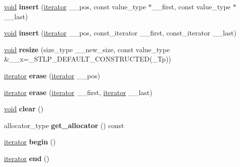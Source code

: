 \begin{DoxyCompactItemize}
\mbox{\label{classdeque_a28b09601f9bfe385b4a813756b20bf4d}} 
\hyperlink{interfacevoid}{void} {\bfseries insert} (\hyperlink{structiterator}{iterator} \+\_\+\+\_\+pos, const value\+\_\+type $\ast$\+\_\+\+\_\+first, const value\+\_\+type $\ast$\+\_\+\+\_\+last)
\item 
\mbox{\label{classdeque_a9d1bb677797bb0a66c9a3fd5ca02576f}} 
\hyperlink{interfacevoid}{void} {\bfseries insert} (\hyperlink{structiterator}{iterator} \+\_\+\+\_\+pos, const\+\_\+iterator \+\_\+\+\_\+first, const\+\_\+iterator \+\_\+\+\_\+last)
\item 
\mbox{\label{classdeque_ae7e21dc40af799077eac515304b8735d}} 
\hyperlink{interfacevoid}{void} {\bfseries resize} (size\+\_\+type \+\_\+\+\_\+new\+\_\+size, const value\+\_\+type \&\+\_\+\+\_\+x=\+\_\+\+S\+T\+L\+P\+\_\+\+D\+E\+F\+A\+U\+L\+T\+\_\+\+C\+O\+N\+S\+T\+R\+U\+C\+T\+ED(\+\_\+\+Tp))
\item 
\mbox{\label{classdeque_a0c84b0b6e601140132de6324489f0b4d}} 
\hyperlink{structiterator}{iterator} {\bfseries erase} (\hyperlink{structiterator}{iterator} \+\_\+\+\_\+pos)
\item 
\mbox{\label{classdeque_a745e68373354ed0bab1ed5edec114c01}} 
\hyperlink{structiterator}{iterator} {\bfseries erase} (\hyperlink{structiterator}{iterator} \+\_\+\+\_\+first, \hyperlink{structiterator}{iterator} \+\_\+\+\_\+last)
\item 
\mbox{\label{classdeque_a43508d2e46158dd2dd01ce2579894c9c}} 
\hyperlink{interfacevoid}{void} {\bfseries clear} ()
\item 
\mbox{\label{classdeque_aac4f51b1ebd3a9a96effbd7302b8c3e9}} 
allocator\+\_\+type {\bfseries get\+\_\+allocator} () const
\item 
\mbox{\label{classdeque_a3f138e445edc68e29f8f8d338406ba89}} 
\hyperlink{structiterator}{iterator} {\bfseries begin} ()
\item 
\mbox{\label{classdeque_a1391e9f01e6d240ae3a083e760ce284b}} 
\hyperlink{structiterator}{iterator} {\bfseries end} ()
\item 

\end{DoxyCompactItemize}
